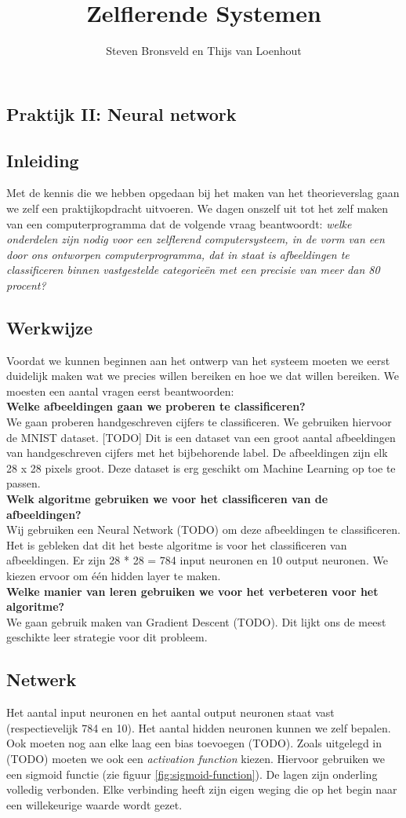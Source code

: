 \documentclass[a4paper,titlepage]{article}
\title{Zelflerende Systemen}
\author{Steven Bronsveld en Thijs van Loenhout}
\begin{document}
\textcolor{praktijk}{
	\section{Praktijk II: Neural network}
}


\subsection{Inleiding}
Met de kennis die we hebben opgedaan bij het maken van het theorieverslag gaan we zelf een praktijkopdracht uitvoeren. We dagen onszelf uit tot het zelf maken van een computerprogramma dat de volgende vraag beantwoordt: \textit{welke onderdelen zijn nodig voor een zelflerend computersysteem, in de vorm van een door ons ontworpen computerprogramma, dat in staat is afbeeldingen te classificeren binnen vastgestelde categorie\"en met een precisie van meer dan 80 procent?}

\subsection{Werkwijze}
Voordat we kunnen beginnen aan het ontwerp van het systeem moeten we eerst duidelijk maken wat we precies willen bereiken en hoe we dat willen bereiken. We moesten een aantal vragen eerst beantwoorden:\\
\textbf{Welke afbeeldingen gaan we proberen te classificeren?}\\
We gaan proberen handgeschreven cijfers te classificeren. We gebruiken hiervoor de MNIST dataset. [TODO] Dit is een dataset van een groot aantal afbeeldingen van handgeschreven cijfers met het bijbehorende label. De afbeeldingen zijn elk 28 x 28 pixels groot. Deze dataset is erg geschikt om Machine Learning op toe te passen.\\
\textbf{Welk algoritme gebruiken we voor het classificeren van de afbeeldingen?}\\
Wij gebruiken een Neural Network (TODO) om deze afbeeldingen te classificeren. Het is gebleken dat dit het beste algoritme is voor het classificeren van afbeeldingen. Er zijn 28 * 28 = 784 input neuronen en 10 output neuronen. We kiezen ervoor om één hidden layer te maken.\\
\textbf{Welke manier van leren gebruiken we voor het verbeteren voor het algoritme?}\\
We gaan gebruik maken van Gradient Descent (TODO). Dit lijkt ons de meest geschikte leer strategie voor dit probleem.

\subsection{Netwerk}
Het aantal input neuronen en het aantal output neuronen staat vast (respectievelijk 784 en 10). Het aantal hidden neuronen kunnen we zelf bepalen. Ook moeten nog aan elke laag een bias toevoegen (TODO). Zoals uitgelegd in (TODO) moeten we ook een \textit{activation function} kiezen. Hiervoor gebruiken we een sigmoid functie (zie figuur \ref{fig:sigmoid-function}). De lagen zijn onderling volledig verbonden. Elke verbinding heeft zijn eigen weging die op het begin naar een willekeurige waarde wordt gezet.
\end{document}
